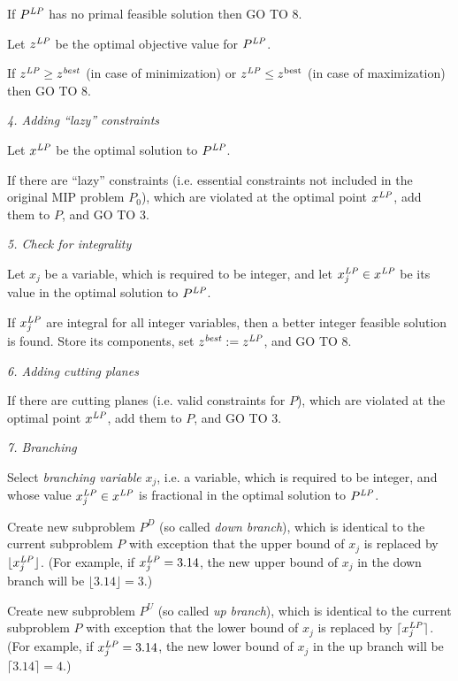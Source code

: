 If $P^{\it LP}$ has no primal feasible solution then GO TO 8.

Let $z^{\it LP}$ be the optimal objective value for $P^{\it LP}$.

If $z^{\it LP}\geq z^{\it best}$ (in case of minimization) or
$z^{\it LP}\leq z^{\rm best}$ (in case of maximization) then GO TO 8.

\medskip

{\it 4. Adding ``lazy'' constraints}

Let $x^{\it LP}$ be the optimal solution to $P^{\it LP}$.

If there are ``lazy'' constraints (i.e. essential constraints not
included in the original MIP problem $P_0$), which are violated at the
optimal point $x^{\it LP}$, add them to $P$, and GO TO 3.

\medskip

{\it 5. Check for integrality}

Let $x_j$ be a variable, which is required to be integer, and let
$x^{\it LP}_j\in x^{\it LP}$ be its value in the optimal solution to
$P^{\it LP}$.

If $x^{\it LP}_j$ are integral for all integer variables, then a better
integer feasible solution is found. Store its components, set
$z^{\it best}:=z^{\it LP}$, and GO TO 8.

\medskip

{\it 6. Adding cutting planes}

If there are cutting planes (i.e. valid constraints for $P$),
which are violated at the optimal point $x^{\it LP}$, add them to $P$,
and GO TO 3.

\medskip

{\it 7. Branching}

Select {\it branching variable} $x_j$, i.e. a variable, which is
required to be integer, and whose value $x^{\it LP}_j\in x^{\it LP}$ is
fractional in the optimal solution to $P^{\it LP}$.

Create new subproblem $P^D$ (so called {\it down branch}), which is
identical to the current subproblem $P$ with exception that the upper
bound of $x_j$ is replaced by $\lfloor x^{\it LP}_j\rfloor$. (For
example, if $x^{\it LP}_j=3.14$, the new upper bound of $x_j$ in the
down branch will be $\lfloor 3.14\rfloor=3$.)

Create new subproblem $P^U$ (so called {\it up branch}), which is
identical to the current subproblem $P$ with exception that the lower
bound of $x_j$ is replaced by $\lceil x^{\it LP}_j\rceil$. (For example,
if $x^{\it LP}_j=3.14$, the new lower bound of $x_j$ in the up branch
will be $\lceil 3.14\rceil=4$.)

